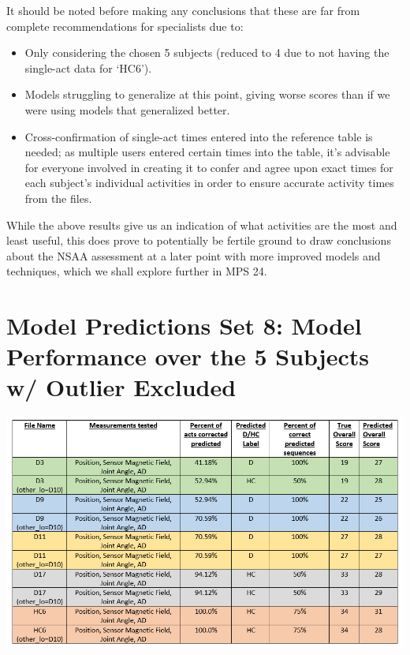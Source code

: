 \documentclass[12pt,twoside]{report}
\begin{document}
\quad It should be noted before making any conclusions that these are far from complete recommendations for specialists due to:

\begin{itemize}
	\item Only considering the chosen 5 subjects (reduced to 4 due to not having the single-act data for ‘HC6’).
	\item Models struggling to generalize at this point, giving worse scores than if we were using models that generalized better.
	\item Cross-confirmation of single-act times entered into the reference table is needed; as multiple users entered certain times into the table, it’s advisable for everyone involved in creating it to confer and agree upon exact times for each subject’s individual activities in order to ensure accurate activity times from the files.
\end{itemize}

\quad While the above results give us an indication of what activities are the most and least useful, this does prove to potentially be fertile ground to draw conclusions about the NSAA assessment at a later point with more improved models and techniques, which we shall explore further in MPS 24.






\section{Model Predictions Set 8: Model Performance over the 5 Subjects w/ Outlier Excluded}

\begin{center}
\includegraphics[scale=0.6]{project_figures/fig11_15}
\end{center}
\end{document}
